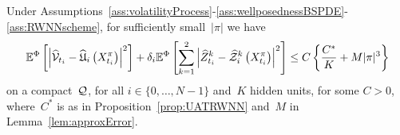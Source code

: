 \begin{lemma}\label{lem:step_RWWN_bound}
Under Assumptions~\ref{ass:volatilityProcess}-\ref{ass:wellposednessBSPDE}-\ref{ass:RWNNscheme}, for sufficiently small~$|\pi|$ we have 
\begin{equation}
\mathbb{E}^\Phi\left[\left|\widehat{\mathcal{V}}_{t_{i}}-\widehat{\mathfrak{U}}_{i}\left(X^\pi_{t_{i}}\right)\right|^{2}\right]+\delta_{i}  \mathbb{E}^\Phi\left[\sum_{k=1}^2\left|\widehat{{Z}}^k_{t_{i}}-\widehat{\mathcal{Z}}^k_{i}\left(X^\pi_{t_{i}}\right)\right|^{2}\right] \leq C\left\{ \frac{C^{*}}{K} +  M|\pi|^3\right\}
\end{equation}
on a compact~$\mathcal{Q}$, 
for all $i\in\{0, \dots, N-1\}$ and~$K$ hidden units, for some $C>0$, where~$C^*$ is as in Proposition~\ref{prop:UATRWNN} and~$M$ in Lemma~\ref{lem:approxError}.
\end{lemma}

